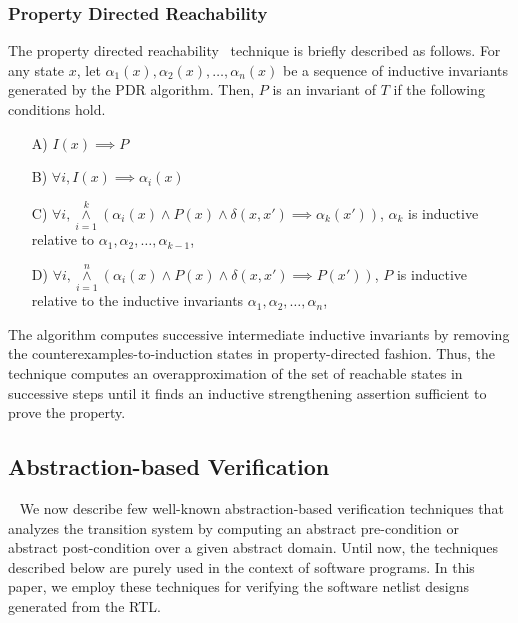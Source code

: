 \subsubsection{Property Directed Reachability} 
%
The property directed reachability~\cite{fmcad07} technique is briefly 
described as follows. 
% 
For any state $x$, let $\alpha_1(x), \alpha_2(x),\ldots,\alpha_n(x)$ be a 
sequence of inductive invariants generated by the PDR algorithm. Then, $P$ 
is an invariant of $T$ if the following conditions hold.
%
\begin{enumerate}
 \item [A)] $I(x) \implies P$
 \item [B)] $\forall i, I(x) \implies \alpha_i(x)$
 \item [C)] $\forall i, {\overset{k}{\underset{i=1}{\wedge}}} 
	 (\alpha_i(x) \wedge P(x) \wedge \delta(x,x') \implies \alpha_k(x'))$,
 $\alpha_k$ is inductive relative to $\alpha_1, \alpha_2,\ldots,\alpha_{k-1}$,
 \item [D)] $\forall i, {\overset{n}{\underset{i=1}{\wedge}}} 
	(\alpha_i(x) \wedge P(x) \wedge \delta(x,x') \implies P(x'))$, 
 $P$ is inductive relative to the inductive invariants $\alpha_1,\alpha_2,\ldots,\alpha_n$, 
\end{enumerate}
%  
The algorithm computes successive intermediate inductive invariants by 
removing the counterexamples-to-induction states in property-directed 
fashion.  Thus, the technique computes an overapproximation of the set of 
reachable states in successive steps until it finds an inductive 
strengthening assertion sufficient to prove the property. 
%
\subsection{Abstraction-based Verification}~\label{software-verif}
%
We now describe few well-known abstraction-based verification 
techniques that analyzes the transition system by computing an 
abstract pre-condition or abstract post-condition over a given 
abstract domain. Until now, the techniques described below 
are purely used in the context of software programs. In this paper, 
we employ these techniques for verifying the software netlist designs 
generated from the RTL. 
